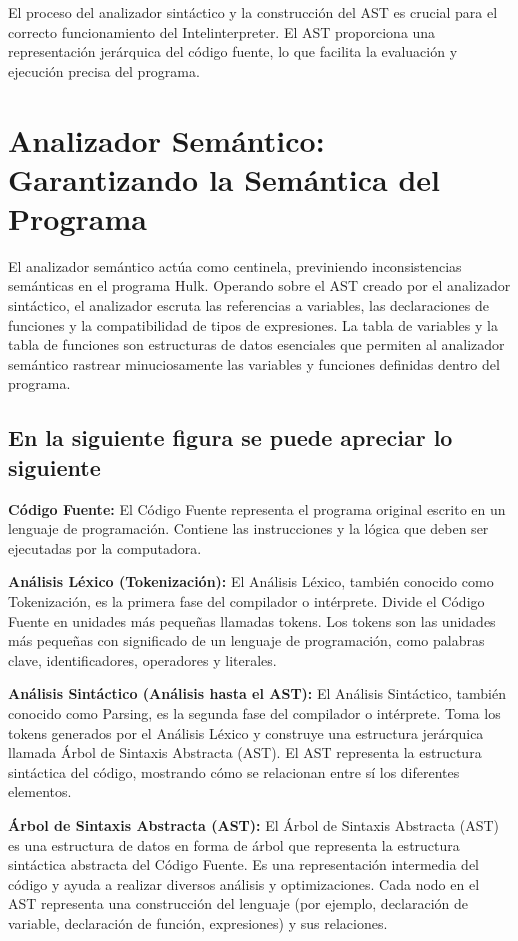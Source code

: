 \documentclass{article}
\begin{document}
El proceso del analizador sintáctico y la construcción del AST es crucial para el correcto funcionamiento del Intelinterpreter. El AST proporciona una representación jerárquica del código fuente, lo que facilita la evaluación y ejecución precisa del programa.




\section{Analizador Semántico: Garantizando la Semántica del Programa}
El analizador semántico actúa como centinela, previniendo inconsistencias semánticas en el programa Hulk. Operando sobre el AST creado por el analizador sintáctico, el analizador escruta las referencias a variables, las declaraciones de funciones y la compatibilidad de tipos de expresiones. La tabla de variables y la tabla de funciones son estructuras de datos esenciales que permiten al analizador semántico rastrear minuciosamente las variables y funciones definidas dentro del programa.


\subsection{En la siguiente figura se puede apreciar lo siguiente}

\textbf{Código Fuente:}
El Código Fuente representa el programa original escrito en un lenguaje de programación. Contiene las instrucciones y la lógica que deben ser ejecutadas por la computadora.

\textbf{Análisis Léxico (Tokenización):}
El Análisis Léxico, también conocido como Tokenización, es la primera fase del compilador o intérprete. Divide el Código Fuente en unidades más pequeñas llamadas tokens.
Los tokens son las unidades más pequeñas con significado de un lenguaje de programación, como palabras clave, identificadores, operadores y literales.

\textbf{Análisis Sintáctico (Análisis hasta el AST):}
El Análisis Sintáctico, también conocido como Parsing, es la segunda fase del compilador o intérprete.
Toma los tokens generados por el Análisis Léxico y construye una estructura jerárquica llamada Árbol de Sintaxis Abstracta (AST).
El AST representa la estructura sintáctica del código, mostrando cómo se relacionan entre sí los diferentes elementos.

\textbf{Árbol de Sintaxis Abstracta (AST):}
El Árbol de Sintaxis Abstracta (AST) es una estructura de datos en forma de árbol que representa la estructura sintáctica abstracta del Código Fuente.
Es una representación intermedia del código y ayuda a realizar diversos análisis y optimizaciones.
Cada nodo en el AST representa una construcción del lenguaje (por ejemplo, declaración de variable, declaración de función, expresiones) y sus relaciones.
\end{document}
